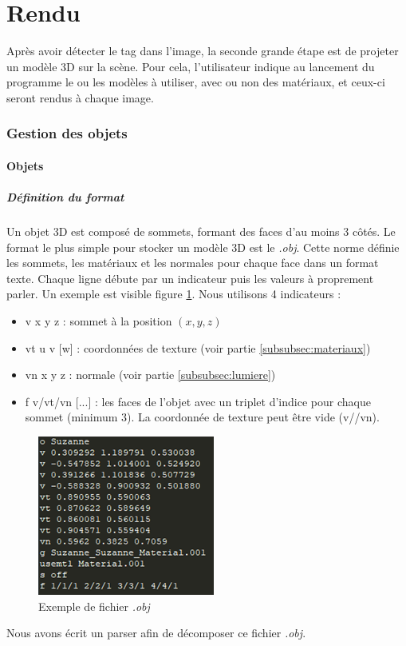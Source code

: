 \part{Rendu}
    Après avoir détecter le tag dans l'image, la seconde grande étape est de projeter un modèle 3D sur la scène. Pour cela, l'utilisateur indique au lancement du programme le ou les modèles à utiliser, avec ou non des matériaux, et ceux-ci seront rendus à chaque image.

    \section{Gestion des objets}

        \subsection{Objets}

            \subsubsection{Définition du format}                
                Un objet 3D est composé de sommets, formant des faces d'au moins 3 côtés. Le format le plus simple pour stocker un modèle 3D est le \emph{.obj}. Cette norme définie les sommets, les matériaux et les normales pour chaque face dans un format texte. Chaque ligne débute par un indicateur puis les valeurs à proprement parler. Un exemple est visible figure \ref{fig:obj}. Nous utilisons 4 indicateurs :
                \begin{itemize}
                    \item v x y z : sommet à la position $(x, y, z)$
                    \item vt u v [w] : coordonnées de texture (voir partie \ref{subsubsec:materiaux})
                    \item vn x y z : normale (voir partie \ref{subsubsec:lumiere})
                    \item f v/vt/vn [...] : les faces de l'objet avec un triplet d'indice pour chaque sommet (minimum 3). La coordonnée de texture peut être vide (v//vn).
                \end{itemize}
                
                \begin{figure}[h]
                    \centering
                    \includegraphics[scale=0.8]{img/rendu/obj.png}
                    \caption{Exemple de fichier \emph{.obj}}
                    \label{fig:obj}
                \end{figure}
                Nous avons écrit un parser afin de décomposer ce fichier \emph{.obj}.

